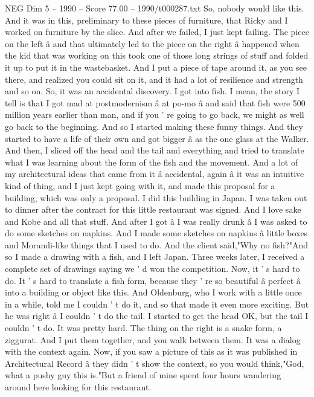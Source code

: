 \begin{textsample}{NEG Dim 5 – 1990 – Score 77.00 – 1990/t000287.txt}
So, nobody would like this.
And it was in this, preliminary to these pieces of furniture, that Ricky and I worked on furniture by the slice.
And after we failed, I just kept failing.
The piece on the left â and that ultimately led to the piece on the right â happened when the kid that was working on this took one of those long strings of stuff and folded it up to put it in the wastebasket.
And I put a piece of tape around it, as you see there, and realized you could sit on it, and it had a lot of resilience and strength and so on.
So, it was an accidental discovery.
I got into fish.
I mean, the story I tell is that I got mad at postmodernism â at po-mo â and said that fish were 500 million years earlier than man, and if you ' re going to go back, we might as well go back to the beginning.
And so I started making these funny things.
And they started to have a life of their own and got bigger â as the one glass at the Walker.
And then, I sliced off the head and the tail and everything and tried to translate what I was learning about the form of the fish and the movement.
And a lot of my architectural ideas that came from it â accidental, again â it was an intuitive kind of thing, and I just kept going with it, and made this proposal for a building, which was only a proposal.
I did this building in Japan.
I was taken out to dinner after the contract for this little restaurant was signed.
And I love sake and Kobe and all that stuff.
And after I got â I was really drunk â I was asked to do some sketches on napkins.
And I made some sketches on napkins â little boxes and Morandi-like things that I used to do.
And the client said,"Why no fish?"And so I made a drawing with a fish, and I left Japan.
Three weeks later, I received a complete set of drawings saying we ' d won the competition.
Now, it ' s hard to do.
It ' s hard to translate a fish form, because they ' re so beautiful â perfect â into a building or object like this.
And Oldenburg, who I work with a little once in a while, told me I couldn ' t do it, and so that made it even more exciting.
But he was right â I couldn ' t do the tail.
I started to get the head OK, but the tail I couldn ' t do.
It was pretty hard.
The thing on the right is a snake form, a ziggurat.
And I put them together, and you walk between them.
It was a dialog with the context again.
Now, if you saw a picture of this as it was published in Architectural Record â they didn ' t show the context, so you would think,"God, what a pushy guy this is."But a friend of mine spent four hours wandering around here looking for this restaurant.

\end{textsample}
